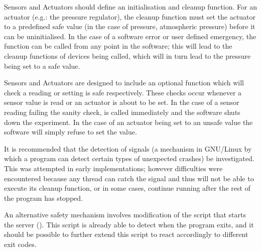 Sensors and Actuators should define an initialisation and cleanup function. For an actuator (e.g.: the pressure regulator), the cleanup function must set the actuator to a predefined safe value (in the case of pressure, atmospheric pressure) before it can be uninitialised. In the case of a software error or user defined emergency, the  function can be called from any point in the software; this will lead to the cleanup functions of devices being called, which will in turn lead to the pressure being set to a safe value. 

Sensors and Actuators are designed to include an optional  function which will check a reading or setting is safe respectively. These checks occur whenever a sensor value is read or an actuator is about to be set. In the case of a sensor reading failing the sanity check,  is called immediately and the software shuts down the experiment. In the case of an actuator being set to an unsafe value the software will simply refuse to set the value.

It is recommended that the detection of signals (a mechanism in GNU/Linux by which a program can detect certain types of unexpected crashes) be investigated. This was attempted in early implementations; however difficulties were encountered because any thread can catch the signal and thus will not be able to execute its cleanup function, or in some cases, continue running after the rest of the program has stopped.

An alternative safety mechanism involves modification of the script that starts the server (). This script is already able to detect when the program exits, and it should be possible to further extend this script to react accordingly to different exit codes.

